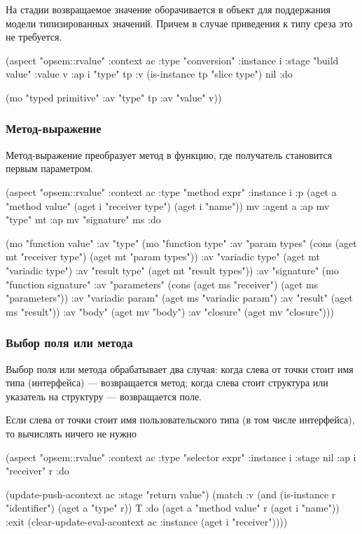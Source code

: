 \documentclass[12pt,twoside,russian]{article}
\newcommand{\textABMLString}[1]{{\color{abmlString}#1}}
\newcommand{\ABMLString}[1]{\abmlinline{\textABMLString{#1}}}
\begin{document}
На стадии \ABMLString{build value} возвращаемое значение оборачивается в объект \ABMLString{typed primitive} для поддержания модели типизированных значений. Причем в случае приведения к типу среза это не требуется.

\begin{ABMLCode}
(aspect "opsem::rvalue" :context ac :type "conversion" :instance i 
  :stage "build value" :value v :ap i "type" tp 
  :v (is-instance tp "slice type") nil :do 
  
  (mo "typed primitive" :av "type" tp :av "value" v))
\end{ABMLCode}


\subsubsection{Метод-выражение}
Метод-выражение преобразует метод в функцию, где получатель становится первым параметром.

\begin{ABMLCode}
(aspect "opsem::rvalue" :context ac :type "method expr" :instance i 
  :p (aget a "method value" (aget i "receiver type") (aget i "name")) mv 
  :agent a :ap mv "type" mt :ap mv "signature" ms :do 
  
  (mo "function value" 
  :av "type"      (mo "function type" 
    :av "param types"    (cons (aget mt "receiver type") 
                               (aget mt "param types"))
    :av "variadic type"  (aget mt "variadic type")
    :av "result type"    (aget mt "result types"))
  :av "signature" (mo "function signature" 
    :av "parameters"     (cons (aget ms "receiver") 
                               (aget ms "parameters"))
    :av "variadic param" (aget ms "variadic param")
    :av "result"         (aget ms "result"))
  :av "body"      (aget mv "body")
  :av "closure"   (aget mv "closure")))
\end{ABMLCode}

\subsubsection{Выбор поля или метода}
Выбор поля или метода обрабатывает два случая: когда слева от точки стоит имя типа (интерфейса) — возвращается метод; когда слева стоит структура или указатель на структуру — возвращается поле.

Если слева от точки стоит имя пользовательского типа (в том числе интерфейса), то вычислять ничего не нужно
\begin{ABMLCode}
(aspect "opsem::rvalue" :context ac :type "selector expr" :instance i 
  :stage nil :ap i "receiver" r :do 
  
  (update-push-acontext ac :stage "return value")
  (match :v (and (is-instance r "identifier") (aget a "type" r)) T 
  :do   (aget a "method value" r (aget i "name"))
  :exit (clear-update-eval-acontext ac :instance (aget i "receiver"))))
\end{ABMLCode}
\end{document}
